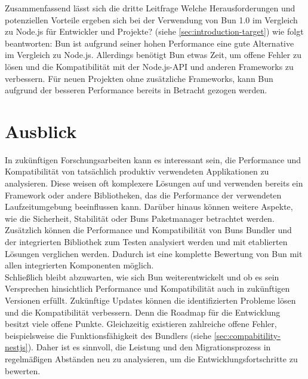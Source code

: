 \noindent
Zusammenfassend lässt sich die dritte Leitfrage \glqq Welche Herausforderungen und potenziellen Vorteile ergeben sich bei der Verwendung von Bun 1.0 im Vergleich zu Node.js für Entwickler und Projekte?\grqq{} (siehe \autoref{sec:introduction-target}) wie folgt beantworten: Bun ist aufgrund seiner hohen Performance eine gute Alternative im Vergleich zu Node.js. Allerdings benötigt Bun etwas Zeit, um offene Fehler zu lösen und die Kompatibilität mit der Node.js-API und anderen Frameworks zu verbessern. Für neuen Projekten ohne zusätzliche Frameworks, kann Bun aufgrund der besseren Performance bereits in Betracht gezogen werden.


\section{Ausblick} \label{sec:finalThoughts-outlook}
In zukünftigen Forschungsarbeiten kann es interessant sein, die Performance und Kompatibilität von tatsächlich produktiv verwendeten Applikationen zu analysieren. Diese weisen oft komplexere Lösungen auf und verwenden bereits ein Framework oder andere Bibliotheken, das die Performance der verwendeten Laufzeitumgebung beeinflussen kann. Darüber hinaus können weitere Aspekte, wie die Sicherheit, Stabilität oder Buns Paketmanager betrachtet werden. Zusätzlich können die Performance und Kompatibilität von Buns Bundler und der integrierten Bibliothek zum Testen analysiert werden und mit etablierten Lösungen verglichen werden. Dadurch ist eine komplette Bewertung von Bun mit allen integrierten Komponenten möglich.\\

\noindent
Schließlich bleibt abzuwarten, wie sich Bun weiterentwickelt und ob es sein Versprechen hinsichtlich Performance und Kompatibilität auch in zukünftigen Versionen erfüllt. Zukünftige Updates können die identifizierten Probleme lösen und die Kompatibilität verbessern. Denn die Roadmap für die Entwicklung besitzt viele offene Punkte. Gleichzeitig existieren zahlreiche offene Fehler, beispielsweise die Funktionsfähigkeit des Bundlers (siehe \autoref{sec:compabitility-nestjs}). Daher ist es sinnvoll, die Leistung und den Migrationsprozess in regelmäßigen Abständen neu zu analysieren, um die Entwicklungsfortschritte zu bewerten.
